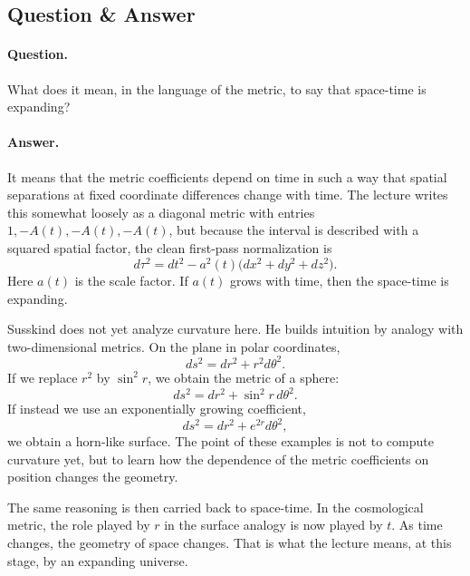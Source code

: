 \subsection{Question \& Answer}

\paragraph{Question.} What does it mean, in the language of the metric, to say that space-time is expanding?

\paragraph{Answer.} It means that the metric coefficients depend on time in such a way that spatial separations at fixed coordinate differences change with time. The lecture writes this somewhat loosely as a diagonal metric with entries \(1,-A(t),-A(t),-A(t)\), but because the interval is described with a squared spatial factor, the clean first-pass normalization is
\begin{equation}
d\tau^2=dt^2-a^2(t)\bigl(dx^2+dy^2+dz^2\bigr).
\end{equation}
Here \(a(t)\) is the scale factor. If \(a(t)\) grows with time, then the space-time is expanding.

Susskind does not yet analyze curvature here. He builds intuition by analogy with two-dimensional metrics. On the plane in polar coordinates,
\begin{equation}
ds^2=dr^2+r^2 d\theta^2.
\end{equation}
If we replace \(r^2\) by \(\sin^2 r\), we obtain the metric of a sphere:
\begin{equation}
ds^2=dr^2+\sin^2 r\,d\theta^2.
\end{equation}
If instead we use an exponentially growing coefficient,
\begin{equation}
ds^2=dr^2+e^{2r}d\theta^2,
\end{equation}
we obtain a horn-like surface. The point of these examples is not to compute curvature yet, but to learn how the dependence of the metric coefficients on position changes the geometry.

The same reasoning is then carried back to space-time. In the cosmological metric, the role played by \(r\) in the surface analogy is now played by \(t\). As time changes, the geometry of space changes. That is what the lecture means, at this stage, by an expanding universe.

